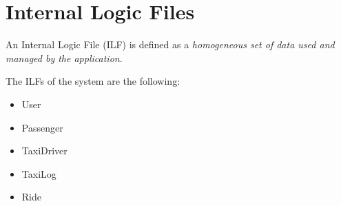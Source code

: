 \section{Internal Logic Files}
An Internal Logic File (ILF) is defined as a \emph{homogeneous set of data used
and managed by the application}.

The ILFs of the system are the following:
\begin{itemize}
	\item User
	\item Passenger
	\item TaxiDriver
	\item TaxiLog
	\item Ride
\end{itemize}

